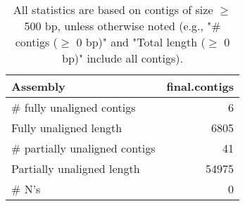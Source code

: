 \documentclass[12pt,a4paper]{article}
\begin{document}
\begin{table}[ht]
\begin{center}
\caption{All statistics are based on contigs of size $\geq$ 500 bp, unless otherwise noted (e.g., "\# contigs ($\geq$ 0 bp)" and "Total length ($\geq$ 0 bp)" include all contigs).}
\begin{tabular}{|l*{1}{|r}|}
\hline
Assembly & final.contigs \\ \hline
\# fully unaligned contigs & 6 \\ \hline
Fully unaligned length & 6805 \\ \hline
\# partially unaligned contigs & 41 \\ \hline
Partially unaligned length & 54975 \\ \hline
\# N's & 0 \\ \hline
\end{tabular}
\end{center}
\end{table}
\end{document}
